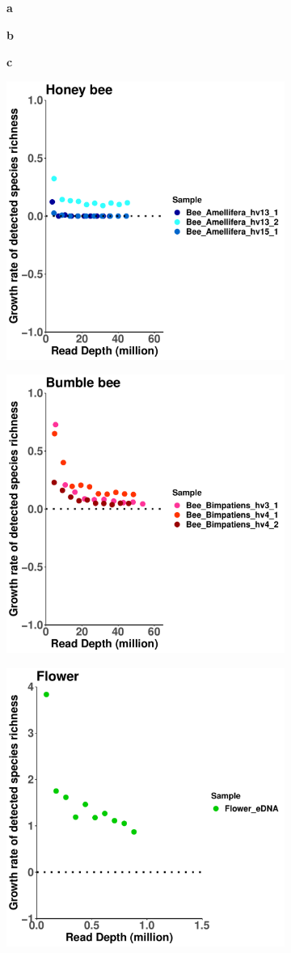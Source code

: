 \documentclass[11pt]{article}
\begin{document}
      \begin{figure}[H]
        \begin{subfigure}
          \centering
          \textbf{a}
        \end{subfigure}
        \hspace{0.32\linewidth}
        \begin{subfigure}
          \centering
          \textbf{b}
        \end{subfigure}
        \hspace{0.32\linewidth}
        \begin{subfigure}
          \centering
          \textbf{c}
        \end{subfigure}
        \newline
        \hfill
        \begin{subfigure}
          \centering
          \includegraphics[width=0.3\linewidth,height=0.3\linewidth]{../Figures/ExtraSpecies_Honey.pdf}
        \end{subfigure}
        \hfill
        \begin{subfigure}
          \centering
          \includegraphics[width=0.3\linewidth,height=0.3\linewidth]{../Figures/ExtraSpecies_Bumble.pdf}
        \end{subfigure}
        \hfill
        \begin{subfigure}
          \centering
          \includegraphics[width=0.3\linewidth,height=0.3\linewidth]{../Figures/ExtraSpecies_Flower.pdf}

\end{subfigure}
\end{figure}
\end{document}
